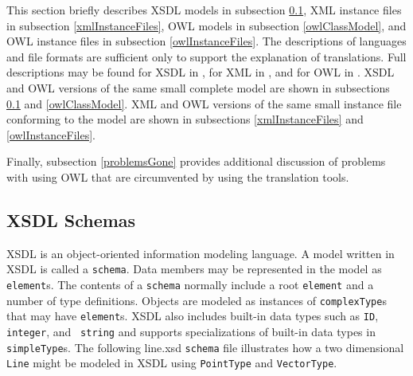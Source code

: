\documentclass[preprint,12pt]{elsarticle}
\begin{document}
This section briefly describes XSDL models in subsection \ref{xmlSchemas},
XML instance files in subsection \ref{xmlInstanceFiles}, OWL models in
subsection \ref{owlClassModel}, and OWL instance files in subsection
\ref{owlInstanceFiles}. The descriptions of languages and file formats are
sufficient only to support the explanation of translations. Full
descriptions may be found for XSDL in \cite{xmlSchema0,xmlSchema1,xmlSchema2,definitive},
for XML in \cite{xml}, and for OWL in \cite{owlPrimer,protege,owlSpecification}. XSDL and OWL
versions of the same small complete model are shown in subsections
\ref{xmlSchemas} and \ref{owlClassModel}. XML and OWL versions of the same
small instance file conforming to the model are shown in subsections
\ref{xmlInstanceFiles} and \ref{owlInstanceFiles}.

Finally, subsection \ref{problemsGone} provides additional discussion of
problems with using OWL that are circumvented by using the translation
tools.

\subsection{XSDL Schemas}
\label{xmlSchemas}

XSDL is an object-oriented information modeling language. A model written
in XSDL is called a {\tt schema}. Data members may be represented in the
model as {\tt element}s. The contents of a {\tt schema} normally include a
root {\tt element} and a number of type definitions. Objects are modeled as
instances of {\tt complexType}s that may have {\tt element}s. XSDL also
includes built-in data types such as {\tt ID}, {\tt integer}, and {\tt
  string} and supports specializations of built-in data types in {\tt
  simpleType}s. The following line.xsd {\tt schema} file illustrates how a
two dimensional {\tt Line} might be modeled in XSDL using {\tt PointType}
and {\tt VectorType}.
\end{document}
